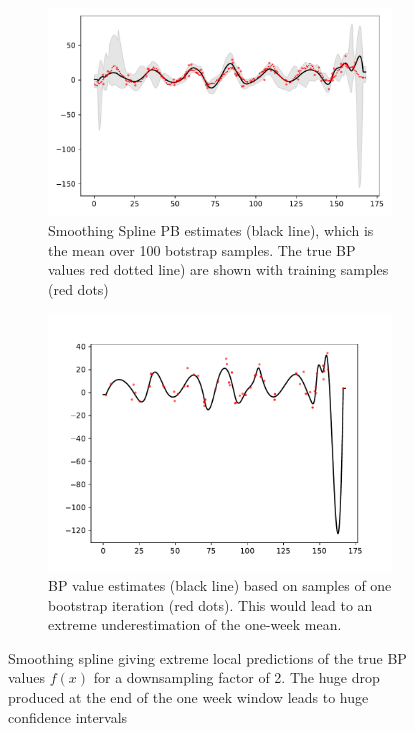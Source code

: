 \begin{figure}[!ht]
\centering
\begin{subfigure}{.5\textwidth}
    \centering
    \includegraphics[width=\linewidth]{Pictures/spline_extreme/plot_posterior_confint_spline}
    \caption{Smoothing Spline PB estimates (black line), which is the mean over 100 botstrap samples.
    The true BP values red dotted line) are shown with training samples (red dots)}
\end{subfigure}\hfill
\begin{subfigure}{.42\textwidth}
    \centering
    \includegraphics[width=\linewidth]{Pictures/spline_extreme/plot_pred_bootstrap_spline_reg_v2_70}
  \caption[Estimate Single Bootstrap Sample]{
      BP value estimates (black line) based on samples of one bootstrap iteration (red dots). This would
  lead to an extreme underestimation of the one-week mean.}
    \label{subfig: ex-spline-failure-bootstrap}
\end{subfigure}
\caption[Smoothing Spline Failure]{
    Smoothing spline giving extreme local predictions of the true BP values $f(x)$
    for a downsampling factor of 2.
    The huge drop produced at the end of the one week window
    leads to huge confidence intervals}
\label{fig:ex-spline-failure}
\end{figure}







